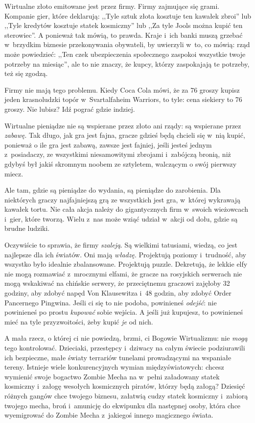 \documentclass[oneside,polish,11pt,rmheadings]{mwbk}
\begin{document}
Wirtualne złoto emitowane jest przez firmy. Firmy zajmujące się grami. Kompanie gier, które deklarują: ,,Tyle sztuk złota kosztuje ten kawałek zbroi'' lub ,,Tyle kredytów kosztuje statek kosmiczny'' lub ,,Za tyle Jools można kupić ten sterowiec''. A ponieważ tak mówią, to prawda. Kraje i~ich banki muszą grzebać w~brzydkim biznesie przekonywania obywateli, by uwierzyli w~to, co mówią: rząd może powiedzieć: ,,Ten czek ubezpieczenia społecznego zaspokoi wszystkie twoje potrzeby na miesiąc'', ale to nie znaczy, że kupcy, którzy zaspokajają te potrzeby, też się zgodzą. 


Firmy nie mają tego problemu. Kiedy Coca Cola mówi, że za 76 groszy kupisz jeden krasnoludzki topór w~Svartalfaheim Warriors, to tyle: cena siekiery to 76 groszy. Nie lubisz? Idź pograć gdzie indziej. 


Wirtualne pieniądze nie są wspierane przez złoto ani rządy: są wspierane przez \textit{zabawę}. Tak długo, jak gra jest fajna, gracze gdzieś będą chcieli się w~nią kupić, ponieważ o ile gra jest zabawą, zawsze jest fajniej, jeśli jesteś jednym z~posiadaczy, ze wszystkimi niesamowitymi zbrojami i~zabójczą bronią, niż gdybyś był jakiś skromnym noobem ze sztyletem, walczącym o swój pierwszy miecz. 


Ale tam, gdzie są pieniądze do wydania, są pieniądze do zarobienia. Dla niektórych graczy najfajniejszą grą ze wszystkich jest gra, w~której wykrawają kawałek tortu. Nie cała akcja należy do gigantycznych firm w~swoich wieżowcach i~gier, które tworzą. Wielu z~nas może wziąć udział w~akcji od dołu, gdzie są brudne ludziki. 


Oczywiście to sprawia, że firmy \textit{szaleją}. Są wielkimi tatusiami, wiedzą, co jest najlepsze dla ich światów. Oni mają \textit{władzę}. Projektują poziomy i~trudność, aby wszystko było idealnie zbalansowane. Projektują puzzle. Dekretują, że lekkie elfy nie mogą rozmawiać z~mrocznymi elfami, że gracze na rosyjskich serwerach nie mogą wskakiwać na chińskie serwery, że przeciętnemu graczowi zajęłoby 32 godziny, aby zdobyć napęd Von Klausewitza i~48 godzin, aby zdobyć Order Pancernego Pingwina. Jeśli ci się to nie podoba, powinieneś \textit{odejść}: nie powinieneś po prostu \textit{kupować }sobie wejścia. A jeśli już kupujesz, to powinieneś mieć na tyle przyzwoitości, żeby kupić \textit{je} od nich. 


A mała rzecz, o której ci nie powiedzą, brzmi, ci Bogowie Wirtualizmu: nie \textit{mogą }tego kontrolować. Dzieciaki, przestępcy i~dziwacy na całym świecie podziurawili ich bezpieczne, małe światy terrariów tunelami prowadzącymi na wspaniałe tereny. Istnieje wiele konkurencyjnych wymian międzyświatowych: chcesz wymienić swoje bogactwo Zombie Mecha na w~pełni załadowany statek kosmiczny i~załogę wesołych kosmicznych piratów, którzy będą załogą? Dziesięć różnych gangów chce twojego biznesu, załatwią cudzy statek kosmiczny i~zabiorą twojego mecha, broń i~amunicję do ekwipunku dla następnej osoby, która chce wyemigrować do Zombie Mecha z~jakiegoś innego magicznego świata. 
\end{document}
